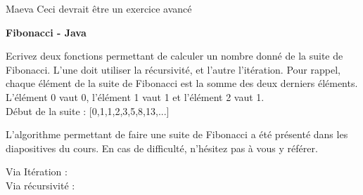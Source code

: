 \begin{note}{Maeva}
    Ceci devrait être un exercice avancé
\end{note}
	\begin{Exercice}[15 minutes] \textbf{Fibonacci - Java} 
	
	Ecrivez deux fonctions permettant de calculer un nombre donné de la suite de Fibonacci. L'une doit utiliser la récursivité, et l'autre l'itération. Pour rappel, chaque élément de la suite de Fibonacci est la somme des deux derniers éléments. L'élément 0 vaut 0, l'élément 1 vaut 1 et l'élément 2 vaut 1. \\
	
	Début de la suite : [0,1,1,2,3,5,8,13,...]
	  
	
		\begin{conseil} 
			L'algorithme permettant de faire une suite de Fibonacci a été présenté dans les diapositives du cours. En cas de difficulté, n'hésitez pas à vous y référer.
		\end{conseil} 
	
		\begin{solution}
			Via Itération : \\
			
				 
				
			Via récursivité : \\
			
				
		\end{solution} 
	
	\end{Exercice}
    
    


